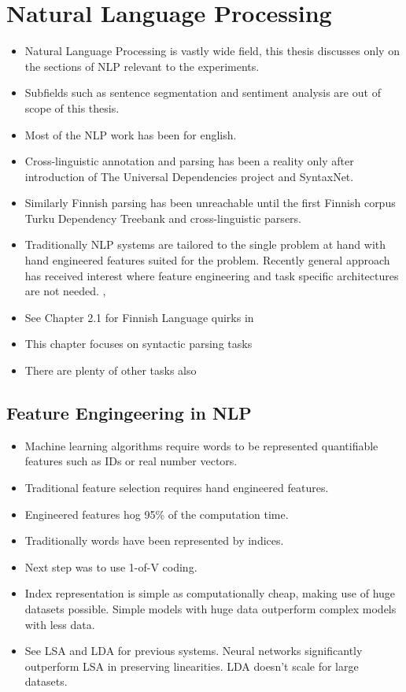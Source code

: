 \documentclass[12pt,a4paper,english
]{tutthesis}
\begin{document}
\chapter{Natural Language Processing}
\label{ch:natural_language_processing}
\begin{itemize}
\item Natural Language Processing is vastly wide field, this thesis discusses only on the sections of NLP relevant to the experiments.
\item Subfields such as sentence segmentation and sentiment analysis are out of scope of this thesis.
\item Most of the NLP work has been for english.
\item Cross-linguistic annotation and parsing has been a reality only after introduction of The Universal Dependencies project and SyntaxNet.
\item Similarly Finnish parsing has been unreachable until the first Finnish corpus Turku Dependency Treebank \cite{Haverinen2014} and cross-linguistic parsers.
\item Traditionally NLP systems are tailored to the single problem at hand with hand engineered features suited for the problem. Recently general approach has received interest where feature engineering and task specific architectures are not needed. \cite{Collobert2011}, \cite{Zhang2015}
\item See Chapter 2.1 for Finnish Language quirks in \cite{Korenius2004}
\item This chapter focuses on syntactic parsing tasks
\item There are plenty of other tasks also
\end{itemize}

\section{Feature Engingeering in NLP}
\label{ch:feature_engineering_in_nlp}
\begin{itemize}
\item Machine learning algorithms require words to be represented quantifiable features such as IDs or real number vectors.
\item Traditional feature selection requires hand engineered features.
\item Engineered features hog 95\% of the computation time. \cite{Chen2014}
\item Traditionally words have been represented by indices. \cite{Mikolov2013}
\item Next step was to use 1-of-V coding.
\item Index representation is simple as computationally cheap, making use of huge datasets possible. Simple models with huge data outperform complex models with less data. \cite{Mikolov2013}
\item See LSA and LDA for previous systems. Neural networks significantly outperform LSA in preserving linearities. LDA doesn't scale for large datasets. \cite{Mikolov2013}
\end{itemize}
\end{document}
